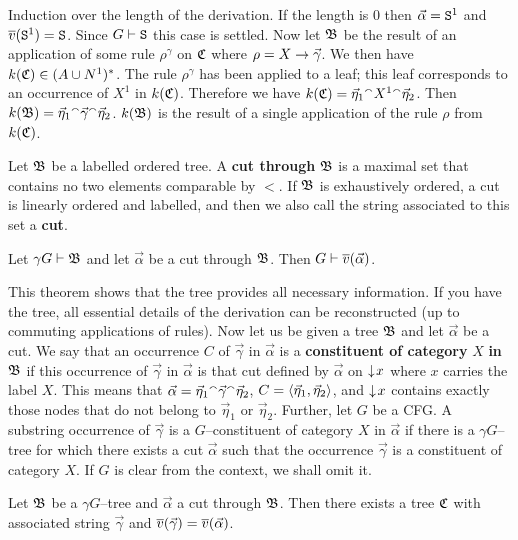 \proofbeg
Induction over the length of the derivation. If the length is
0 then $\vec{\alpha} = \mbox{\tt S}^1$ and $\overline{v}(\mbox{\tt S}^1) 
= \mbox{\tt S}$. Since $G \vdash \mbox{\tt S}$ this case is settled. 
Now let $\mathfrak{B}$ be the result of an application of some rule $\rho^{\gamma}$
on $\mathfrak{C}$ where $\rho = X \rightarrow \vec{\gamma}$. We then have
$k(\mathfrak{C}) \in (A \cup N^1)^{\ast}$. The rule $\rho^{\gamma}$
has been applied to a leaf; this leaf corresponds to an 
occurrence of $X^1$ in $k(\mathfrak{C})$. Therefore we have
$k(\mathfrak{C}) = \vec{\eta}_1 {^{\smallfrown}} X^1 {^{\smallfrown}} \vec{\eta}_2$. Then
$k(\mathfrak{B}) = \vec{\eta}_1 {^{\smallfrown}} \vec{\gamma} {^{\smallfrown}} \vec{\eta}_2$.
$k(\mathfrak{B})$ is the result of a single application of the rule
$\rho$ from $k(\mathfrak{C})$.
\proofend
\begin{defn}
Let $\mathfrak{B}$ be a labelled ordered tree. A \textbf{cut through} $\mathfrak{B}$ is
a maximal set that contains no two elements comparable by $<$. If 
$\mathfrak{B}$ is exhaustively ordered, a cut is linearly ordered and labelled, 
and then we also call the string associated to this set a 
\textbf{cut}.
\end{defn}
\begin{prop}
Let $\gamma G \vdash \mathfrak{B}$ and let $\vec{\alpha}$ be a cut through
$\mathfrak{B}$. Then $G \vdash \overline{v}(\vec{\alpha})$.
\end{prop}
This theorem shows that the tree provides all necessary information.
If you have the tree, all essential details of the derivation can
be reconstructed (up to commuting applications of rules). Now let
us be given a tree $\mathfrak{B}$ and let $\vec{\alpha}$ be a cut.
We say that an occurrence $C$ of $\vec{\gamma}$ in $\vec{\alpha}$
is a \textbf{constituent of category} $X$ \textbf{in} $\mathfrak{B}$ if 
this occurrence of $\vec{\gamma}$ in $\vec{\alpha}$ is that cut 
defined by $\vec{\alpha}$ on ${\downarrow\! x}$ where $x$ carries the label 
$X$.
This means that $\vec{\alpha} = \vec{\eta}_1 {^{\smallfrown}} \vec{\gamma}
{^{\smallfrown}} \vec{\eta}_2$, $C = \langle \vec{\eta}_1, \vec{\eta}_2\rangle$,
and ${\downarrow\! x}$ contains exactly those nodes that do not belong
to $\vec{\eta}_1$ or $\vec{\eta}_2$. Further, let $G$ be a 
CFG. A substring occurrence of $\vec{\gamma}$ is 
a $G$--constituent of category $X$ in $\vec{\alpha}$ if there is a 
$\gamma G$--tree for which there exists a cut $\vec{\alpha}$ such that 
the occurrence $\vec{\gamma}$ is a constituent of category $X$. If 
$G$ is clear from the context, we shall omit it. 
\begin{lem}
\label{wegmachen}
Let $\mathfrak{B}$ be a $\gamma G$--tree and $\vec{\alpha}$ a cut through
$\mathfrak{B}$. Then there exists a tree $\mathfrak{C}$ with associated string
$\vec{\gamma}$ and $\overline{v}(\vec{\gamma}) = \overline{v}(\vec{\alpha})$.
\end{lem}
